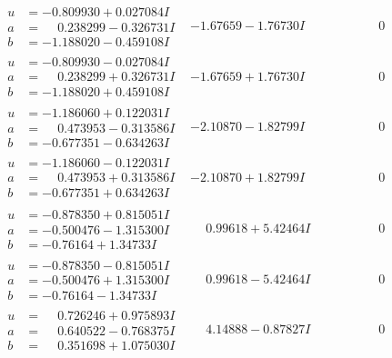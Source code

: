 \documentclass[1p]{elsarticle_modified}
\theoremstyle{definition}
\begin{document}
$$\begin{array}{c|c|c}
\begin{aligned}
u &= -0.809930 + 0.027084 I \\
a &= \phantom{-}0.238299 - 0.326731 I \\
b &= -1.188020 - 0.459108 I\end{aligned}
 & -1.67659 - 1.76730 I & \phantom{-0.000000 } 0 \\ \hline\begin{aligned}
u &= -0.809930 - 0.027084 I \\
a &= \phantom{-}0.238299 + 0.326731 I \\
b &= -1.188020 + 0.459108 I\end{aligned}
 & -1.67659 + 1.76730 I & \phantom{-0.000000 } 0 \\ \hline\begin{aligned}
u &= -1.186060 + 0.122031 I \\
a &= \phantom{-}0.473953 - 0.313586 I \\
b &= -0.677351 - 0.634263 I\end{aligned}
 & -2.10870 - 1.82799 I & \phantom{-0.000000 } 0 \\ \hline\begin{aligned}
u &= -1.186060 - 0.122031 I \\
a &= \phantom{-}0.473953 + 0.313586 I \\
b &= -0.677351 + 0.634263 I\end{aligned}
 & -2.10870 + 1.82799 I & \phantom{-0.000000 } 0 \\ \hline\begin{aligned}
u &= -0.878350 + 0.815051 I \\
a &= -0.500476 - 1.315300 I \\
b &= -0.76164 + 1.34733 I\end{aligned}
 & \phantom{-}0.99618 + 5.42464 I & \phantom{-0.000000 } 0 \\ \hline\begin{aligned}
u &= -0.878350 - 0.815051 I \\
a &= -0.500476 + 1.315300 I \\
b &= -0.76164 - 1.34733 I\end{aligned}
 & \phantom{-}0.99618 - 5.42464 I & \phantom{-0.000000 } 0 \\ \hline\begin{aligned}
u &= \phantom{-}0.726246 + 0.975893 I \\
a &= \phantom{-}0.640522 - 0.768375 I \\
b &= \phantom{-}0.351698 + 1.075030 I\end{aligned}
 & \phantom{-}4.14888 - 0.87827 I & \phantom{-0.000000 } 0 \\ \hline\begin{aligned}

\end{aligned}
\end{array}$$
\end{document}
